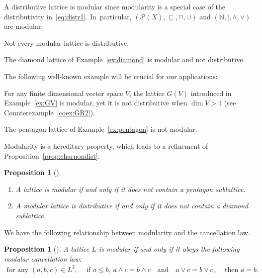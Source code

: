 \documentclass[pdftex]{sigma}
\numberwithin{equation}{section}
\newtheorem{Proposition}[Theorem]{Proposition}
\newcommand{\N}{\mathbb{N}}
\begin{document}
\begin{Example}
A distributive lattice is modular since modularity is a special case of the distributivity in~\eqref{eq:distr1}. In~particular,
$({\mathcal P}(X), \subseteq, \cap, \cup)$ and $(\N, \vert, \wedge, \vee)$ are modular.
	\end{Example}

Not every modular lattice is distributive.

\begin{Example}
The diamond lattice of Example~\ref{ex:diamond} is modular and not distributive.
\end{Example}
	
	The following well-known example will be crucial for our applications:
	\begin{Example}\label{ex:GVmodularity}
		For any finite dimensional vector space $V$, the \subsp lattice $G(V)$ introduced in Example~\ref{ex:GV} is modular, yet it is not distributive when $\dim V>1$ (see
		Counterexample~\ref{coex:GR2}).
	\end{Example}
\begin{coex}
The pentagon lattice of Example~\ref{ex:pentagon} is not modular.
	\end{coex}

Modularity is a hereditary property, which leads to a refinement of Proposition~\ref{prop:charnondist}.

\begin{Proposition}[{\cite[Theorems~101 and 102]{Gra1}}]%
\qquad
\begin{enumerate}\itemsep=0pt
\item[$(a)$]
A lattice is modular if and only if it does not contain a pentagon sublattice.
\item[$(b)$]
A modular lattice is distributive if and only if it does not contain a diamond sublattice.
\end{enumerate}
\end{Proposition}

We have the following relationship between modularity and the cancellation law.
\begin{Proposition}[{\cite[Corollary~2.1.1]{PR}}]
A lattice $L$ is modular if and only if it obeys the following {\it modular cancellation law}:
\begin{gather*}
\text{for any } (a, b, c)\in L^3, \quad\ \text{if } a\leq b,\, a\wedge c=b\wedge c\quad \text{and}\quad a\vee c=b\vee c,\quad\ \text{then } a=b.
	\end{gather*}
\end{Proposition}
\end{document}
